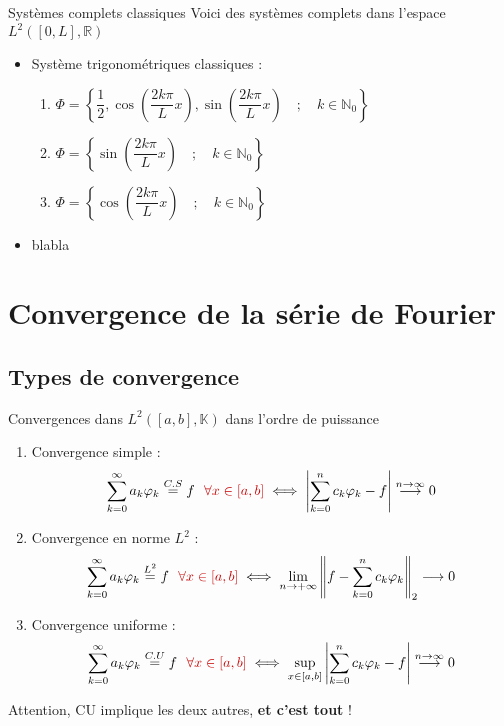 \documentclass[9pt]{beamer}
\newcommand\serieak{\sum_{k=0} ^\infty a_k \varphi_k}
\newcommand\serienck{\sum_{k=0} ^n c_k \varphi_k}
\begin{document}
\begin{frame}{Systèmes complets classiques}
Voici des systèmes complets dans l'espace $L^2([0,L], \mathbb{R})$
\begin{itemize}
	\item Système trigonométriques classiques :
		\begin{enumerate}
		\item $\Phi = \left\{\dfrac{1}{2}, \cos\left(\dfrac{2k			\pi}{L} x\right),\sin\left(\dfrac{2k\pi}{L} x\right) 			\quad ; \quad  k \in \mathbb{N}_0  \right\} $
		\item $\Phi = \left\{ \sin\left(\dfrac{2k\pi}{L} x\right) \quad ; \quad k \in \mathbb{N}_ 0 \right\}$
		\item $\Phi = \left\{ \cos\left(\dfrac{2k\pi}{L} x\right) \quad ; \quad k \in \mathbb{N}_0 \right\}$
		\end{enumerate}
	\item blabla
\end{itemize}
\end{frame}
\section{Convergence de la série de Fourier}
\begin{frame}
\tableofcontents[currentsection]
\end{frame}
\subsection{Types de convergence}
\begin{frame}{Convergences dans $L^2([a,b], \mathbb{K})$ dans l'ordre de puissance}
\begin{enumerate}
\item Convergence simple : 
$$ \serieak \stackrel{C.S}{=} f \ \  \rouge{\forall x \in [a,b]} \iff \left| \serienck - f \right| \stackrel{\small n\rightarrow \infty}{\longrightarrow} 0$$ 

\item Convergence en norme $L^2$ :
$$ \serieak \stackrel{L^2}{=} f \ \  \rouge{\forall x \in [a,b]} \iff  \lim_{n\rightarrow +\infty} \left\| f - \serienck \right\| _2 \longrightarrow 0$$

\item Convergence uniforme :
$$\serieak \stackrel{C.U}{=} f \ \  \rouge{\forall x \in [a,b]} \iff \sup_{x\in [a,b]}  \left| \serienck - f \right| \stackrel{\small n\rightarrow \infty}{\longrightarrow} 0 $$
\end{enumerate}
Attention, CU implique les deux autres, \textbf{et c'est tout} !
\end{frame}
\end{document}
